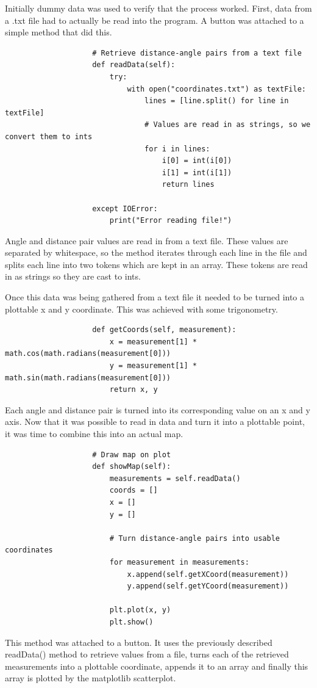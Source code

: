				Initially dummy data was used to verify that the process worked. First, data from a .txt file had to actually be read into the program. A button was attached to a simple method that did this.
				\begin{lstlisting}
					# Retrieve distance-angle pairs from a text file
					def readData(self):
						try:
							with open("coordinates.txt") as textFile:
								lines = [line.split() for line in textFile]
								# Values are read in as strings, so we convert them to ints
								for i in lines:
									i[0] = int(i[0])
									i[1] = int(i[1])
									return lines
						
					except IOError:
						print("Error reading file!") 
				\end{lstlisting}
				Angle and distance pair values are read in from a text file. These values are separated by whitespace, so the method iterates through each line in the file and splits each line into two tokens which are kept in an array. These tokens are read in as strings so they are cast to ints.
				
				Once this data was being gathered from a text file it needed to be turned into a plottable x and y coordinate. This was achieved with some trigonometry.
				\begin{lstlisting}
					def getCoords(self, measurement):
						x = measurement[1] * math.cos(math.radians(measurement[0]))
						y = measurement[1] * math.sin(math.radians(measurement[0]))
						return x, y
				\end{lstlisting}
				Each angle and distance pair is turned into its corresponding value on an x and y axis. Now that it was possible to read in data and turn it into a plottable point, it was time to combine this into an actual map.
				
				\begin{lstlisting}
					# Draw map on plot
					def showMap(self):
						measurements = self.readData()
						coords = []
						x = []
						y = []
						
						# Turn distance-angle pairs into usable coordinates
						for measurement in measurements:
							x.append(self.getXCoord(measurement))
							y.append(self.getYCoord(measurement))
						
						plt.plot(x, y)
						plt.show()
				\end{lstlisting}
				This method was attached to a button. It uses the previously described readData() method to retrieve values from a file, turns each of the retrieved measurements into a plottable coordinate, appends it to an array and finally this array is plotted by the matplotlib scatterplot.
				

